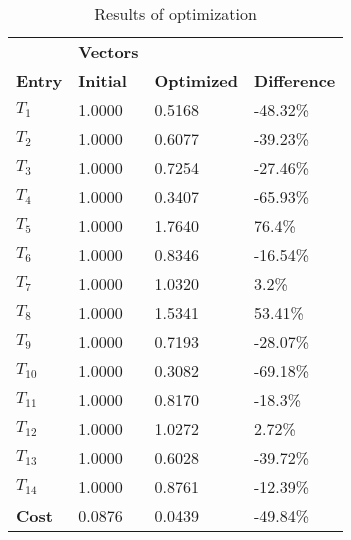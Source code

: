 \begin{table}[H]
\centering
\begin{tabular}{llll}
\textbf{}      & \cellcolor[HTML]{EFEFEF}\textbf{Vectors} & \textbf{} & \textbf{}         \\
\rowcolor[HTML]{EFEFEF} 
\textbf{Entry} & \textbf{Initial} & \textbf{Optimized} & \textbf{Difference} \\
$T_1$ & 1.0000 & 0.5168 & -48.32\% \\ 
$T_2$ & 1.0000 & 0.6077 & -39.23\% \\ 
$T_3$ & 1.0000 & 0.7254 & -27.46\% \\ 
$T_4$ & 1.0000 & 0.3407 & -65.93\% \\ 
$T_5$ & 1.0000 & 1.7640 & 76.4\% \\ 
$T_6$ & 1.0000 & 0.8346 & -16.54\% \\ 
$T_7$ & 1.0000 & 1.0320 & 3.2\% \\ 
$T_8$ & 1.0000 & 1.5341 & 53.41\% \\ 
$T_9$ & 1.0000 & 0.7193 & -28.07\% \\ 
$T_10$ & 1.0000 & 0.3082 & -69.18\% \\ 
$T_11$ & 1.0000 & 0.8170 & -18.3\% \\ 
$T_12$ & 1.0000 & 1.0272 & 2.72\% \\ 
$T_13$ & 1.0000 & 0.6028 & -39.72\% \\ 
$T_14$ & 1.0000 & 0.8761 & -12.39\% \\ 
\rowcolor[HTML]{EFEFEF} 
\textbf{Cost}  & 0.0876 & 0.0439 & -49.84\% \\ 
\end{tabular}
\caption{Results of optimization}
\label{tab:OptimizationAnalysis}
\end{table}